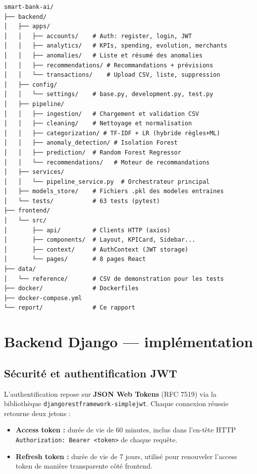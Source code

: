 \documentclass[12pt,a4paper]{report}
\begin{document}
\begin{lstlisting}[style=bash, caption={Structure du projet Smart Bank AI},
                   label={lst:structure}]
smart-bank-ai/
├── backend/
│   ├── apps/
│   │   ├── accounts/    # Auth: register, login, JWT
│   │   ├── analytics/   # KPIs, spending, evolution, merchants
│   │   ├── anomalies/   # Liste et résumé des anomalies
│   │   ├── recommendations/ # Recommandations + prévisions
│   │   └── transactions/    # Upload CSV, liste, suppression
│   ├── config/
│   │   └── settings/    # base.py, development.py, test.py
│   ├── pipeline/
│   │   ├── ingestion/   # Chargement et validation CSV
│   │   ├── cleaning/    # Nettoyage et normalisation
│   │   ├── categorization/ # TF-IDF + LR (hybride règles+ML)
│   │   ├── anomaly_detection/ # Isolation Forest
│   │   ├── prediction/  # Random Forest Regressor
│   │   └── recommendations/   # Moteur de recommandations
│   ├── services/
│   │   └── pipeline_service.py  # Orchestrateur principal
│   ├── models_store/    # Fichiers .pkl des modeles entraines
│   └── tests/           # 63 tests (pytest)
├── frontend/
│   └── src/
│       ├── api/         # Clients HTTP (axios)
│       ├── components/  # Layout, KPICard, Sidebar...
│       ├── context/     # AuthContext (JWT storage)
│       └── pages/       # 8 pages React
├── data/
│   └── reference/       # CSV de demonstration pour les tests
├── docker/              # Dockerfiles
├── docker-compose.yml
└── report/              # Ce rapport
\end{lstlisting}

\section{Backend Django — implémentation}

\subsection{Sécurité et authentification JWT}

L'authentification repose sur \textbf{JSON Web Tokens} (RFC 7519)
via la bibliothèque \texttt{djangorestframework-simplejwt}. Chaque connexion
réussie retourne deux jetons :

\begin{itemize}[noitemsep]
  \item \textbf{Access token :} durée de vie de 60 minutes, inclus dans
    l'en-tête HTTP \texttt{Authorization: Bearer <token>} de chaque requête.
  \item \textbf{Refresh token :} durée de vie de 7 jours, utilisé pour
    renouveler l'access token de manière transparente côté frontend.
\end{itemize}
\end{document}
